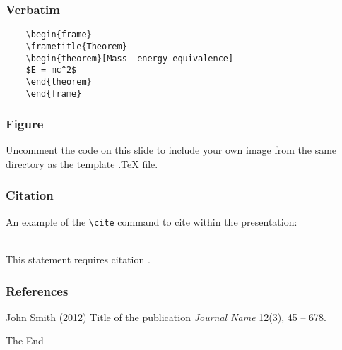 \documentclass{beamer}
\begin{document}
    
    \begin{frame}[fragile] %
    \frametitle{Verbatim}
    \begin{example}
    \begin{verbatim}
    \begin{frame}
    \frametitle{Theorem}
    \begin{theorem}[Mass--energy equivalence]
    $E = mc^2$
    \end{theorem}
    \end{frame}\end{verbatim}
    \end{example}
    \end{frame}
    
    
    \begin{frame}
    \frametitle{Figure}
    Uncomment the code on this slide to include your own image from the same directory as the template .TeX file.
    \end{frame}
    
    
    \begin{frame}[fragile] %
    \frametitle{Citation}
    An example of the \verb|\cite| command to cite within the presentation:\\~
    
    This statement requires citation \cite{p1}.
    \end{frame}
    
    
    \begin{frame}
    \frametitle{References}
    \footnotesize{
    \begin{thebibliography}{99} %
     John Smith (2012)
    \newblock Title of the publication
    \newblock \emph{Journal Name} 12(3), 45 -- 678.
    \end{thebibliography}
    }
    \end{frame}
    
    
    \begin{frame}
    \Huge{\centerline{The End}}
    \end{frame}
    
    
    
\end{document}
